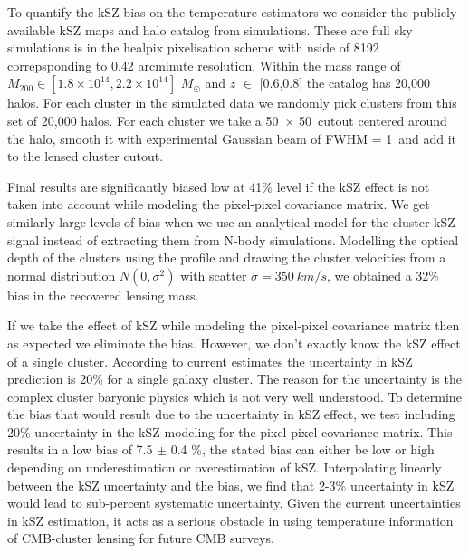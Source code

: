 To quantify the kSZ bias on the temperature estimators we consider the publicly available kSZ maps and halo catalog from \citet{flender16} simulations.
These are full sky simulations is in the healpix \citep{gorski05} pixelisation scheme with nside of 8192 correpsponding to 0.42 arcminute resolution.
Within the mass range of $M_{200} \in [1.8 \times 10^{14},2.2 \times 10^{14}]$ $M_{\odot}$ and $z$ $\in$ [0.6,0.8] the catalog has 20,000 halos. 
For each cluster in the simulated data we randomly pick clusters from this set of 20,000 halos. For each cluster we take a 50\am\ $\times$ 50\am\ cutout centered around the halo, smooth it with experimental Gaussian beam of FWHM = 1\am\ and add it to the lensed cluster cutout. 

Final results are significantly biased low at 41\% level if the kSZ effect is not taken into account while modeling the pixel-pixel covariance matrix. We get similarly large levels of bias when we use an analytical model for the cluster kSZ signal instead of extracting them from N-body simulations. Modelling the optical depth of the clusters using the \citet{battaglia16b} profile and drawing the cluster velocities from a normal distribution $N(0, \sigma^{2})$ with scatter $\sigma = 350\ km/s$, we obtained a 32\% bias in the recovered lensing mass.
  
 If we take the effect of kSZ while modeling the pixel-pixel covariance matrix then as expected we eliminate the bias. 
 However, we don't exactly know the kSZ effect of a single cluster. According to current estimates the uncertainty in kSZ prediction is 20\% for a single galaxy cluster. 
 The reason for the uncertainty is the complex cluster baryonic physics which is not very well understood. 
 To determine the bias that would result due to the uncertainty in kSZ effect, we test including 20\% uncertainty in the kSZ modeling for the pixel-pixel covariance matrix. 
 This results in a low bias of 7.5 $\pm $ 0.4 \%, the stated bias can either be low or high depending on underestimation or overestimation of kSZ.
 Interpolating linearly between the kSZ uncertainty and the bias, we find that 2-3\% uncertainty in kSZ would lead to sub-percent systematic uncertainty. 
 Given the current uncertainties in kSZ estimation, it acts as a serious obstacle in using temperature information of CMB-cluster lensing for future CMB surveys. 
 
